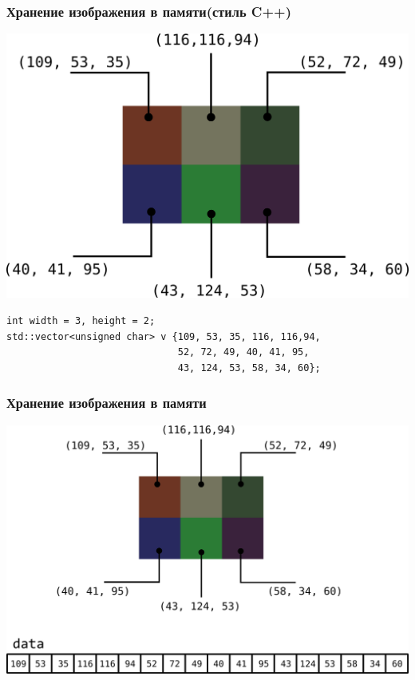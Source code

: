 \documentclass[10pt,pdf,hyperref={unicode}]{beamer}
\begin{document}
\begin{frame}[fragile]
\frametitle{Хранение изображения в памяти(стиль C++)} 

\begin{center}
\includegraphics[scale=0.55]{./images/tiny_new_wn.png}
\end{center}

\begin{lstlisting}
int width = 3, height = 2;
std::vector<unsigned char> v {109, 53, 35, 116, 116,94, 
                              52, 72, 49, 40, 41, 95,
                              43, 124, 53, 58, 34, 60};
\end{lstlisting}
\end{frame}


\begin{frame}[fragile]
\frametitle{Хранение изображения в памяти} 

\begin{center}
\includegraphics[scale=0.55]{./images/image_in_memory.png}
\end{center}
\end{frame}
\end{document}
